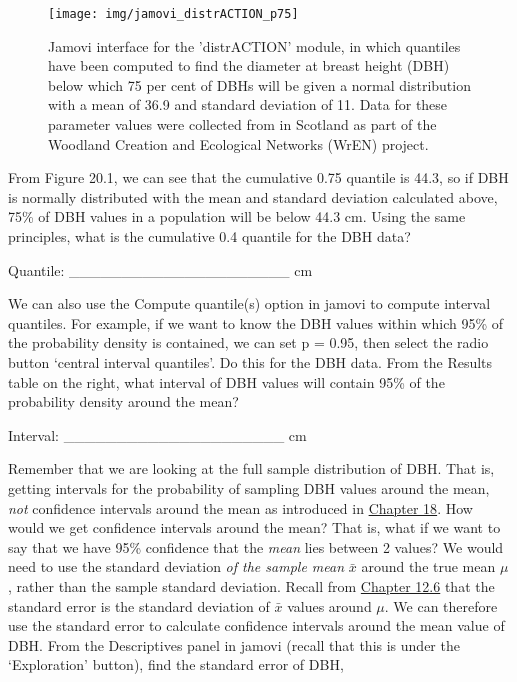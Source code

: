 \documentclass[
  openany]{scrbook}
\begin{document}
\begin{figure}
\texttt{[image: img/jamovi\_distrACTION\_p75]} \caption{Jamovi interface for the 'distrACTION' module, in which quantiles have been computed to find the diameter at breast height (DBH) below which 75 per cent of DBHs will be given a normal distribution with a mean of 36.9 and standard deviation of 11. Data for these parameter values were collected from in Scotland as part of the Woodland Creation and Ecological Networks (WrEN) project.}\label{fig:unnamed-chunk-79}
\end{figure}

From Figure 20.1, we can see that the cumulative 0.75 quantile is 44.3, so if DBH is normally distributed with the mean and standard deviation calculated above, 75\% of DBH values in a population will be below 44.3 cm.
Using the same principles, what is the cumulative 0.4 quantile for the DBH data?

Quantile: \_\_\_\_\_\_\_\_\_\_\_\_\_\_\_\_\_\_\_\_\_ cm

We can also use the Compute quantile(s) option in jamovi to compute interval quantiles.
For example, if we want to know the DBH values within which 95\% of the probability density is contained, we can set p = 0.95, then select the radio button `central interval quantiles'.
Do this for the DBH data.
From the Results table on the right, what interval of DBH values will contain 95\% of the probability density around the mean?

Interval: \_\_\_\_\_\_\_\_\_\_\_\_\_\_\_\_\_\_\_\_\_ cm

Remember that we are looking at the full sample distribution of DBH.
That is, getting intervals for the probability of sampling DBH values around the mean, \emph{not} confidence intervals around the mean as introduced in \protect\hyperlink{Chapter_18}{Chapter 18}.
How would we get confidence intervals around the mean?
That is, what if we want to say that we have 95\% confidence that the \emph{mean} lies between 2 values?
We would need to use the standard deviation \emph{of the sample mean} \(\bar{x}\) around the true mean \(\mu\), rather than the sample standard deviation.
Recall from \href{Chapter_12.html\#the-standard-error}{Chapter 12.6} that the standard error is the standard deviation of \(\bar{x}\) values around \(\mu\).
We can therefore use the standard error to calculate confidence intervals around the mean value of DBH.
From the Descriptives panel in jamovi (recall that this is under the `Exploration' button), find the standard error of DBH,
\end{document}
